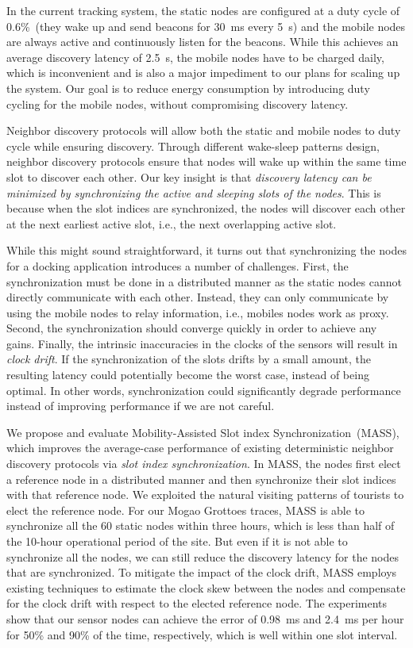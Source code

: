 \documentclass[twoside,twocolumn]{article}
\begin{document}
In the current tracking system, the static nodes are configured at a duty cycle of 0.6\%~(they wake up and send beacons
for 30~ms every 5~s) and the mobile nodes are always active and continuously listen for the beacons. While this achieves
an average discovery latency of 2.5~s, the mobile nodes have to be charged daily, which is inconvenient and is also a
major impediment to our plans for scaling up the system. Our goal is to reduce energy consumption by introducing duty
cycling for the mobile nodes, without compromising discovery latency.

Neighbor discovery protocols will allow both the static and mobile nodes to duty cycle while ensuring discovery. Through
different wake-sleep patterns design, neighbor discovery protocols ensure that nodes will wake up within the same time
slot to discover each other. Our key insight is that \emph{discovery latency can be minimized by synchronizing the active 
and sleeping slots of the nodes}. This is because when the slot indices are synchronized, the nodes will discover each 
other at the next earliest active slot, i.e., the next overlapping active slot.

While this might sound straightforward, it turns out that synchronizing the nodes for a docking application introduces
a number of challenges. First, the synchronization must be done in a distributed manner as the static nodes cannot 
directly communicate with each other. Instead, they can only communicate by using the mobile nodes to relay information,
 i.e., mobiles nodes work as proxy. Second, the synchronization should converge quickly in order to achieve any gains. 
Finally, the intrinsic inaccuracies in the clocks of the sensors will result in \emph{clock drift}. If the synchronization 
of the slots drifts by a small amount, the resulting latency could potentially become the worst case, instead of being optimal. 
In other words, synchronization could significantly degrade performance instead of improving performance if we are not careful.

We propose and evaluate Mobility-Assisted Slot index Synchronization~(MASS), which improves the average-case performance
of existing deterministic neighbor discovery protocols via \emph{slot index synchronization}. In MASS, the nodes first
elect a reference node in a distributed manner and then synchronize their slot indices with that reference node. We
exploited the natural visiting patterns of tourists to elect the reference node. For our Mogao Grottoes traces, MASS is
able to synchronize all the 60 static nodes within three hours, which is less than half of the 10-hour operational period
of the site. But even if it is not able to synchronize all the nodes, we can still reduce the discovery latency for the
nodes that are synchronized. To mitigate the impact of the clock drift, MASS employs existing techniques to estimate the 
clock skew between the nodes and compensate for the clock drift with respect to the elected reference node. The experiments
show that our sensor nodes can achieve the error of 0.98~ms and 2.4~ms per hour for 50\% and 90\% of the time, respectively,
which is well within one slot interval.
\end{document}
